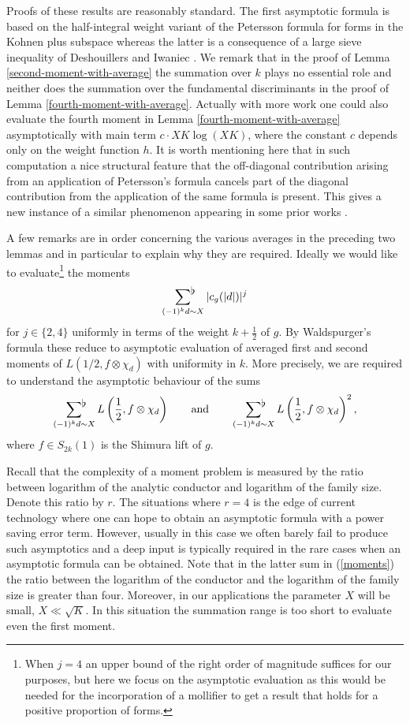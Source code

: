 \documentclass[a4paper,10pt,twoside]{amsart}
\theoremstyle{definition}
\numberwithin{equation}{section}
\renewcommand\:{\colon}
\newcommand{\sumflat}{\mathop{{\sum}^{\raisebox{-3pt}{\makebox[0pt][l]{$\flat$}}}}}
\begin{document}
Proofs of these results are reasonably standard. The first asymptotic formula is based on the half-integral weight variant of the Petersson formula for forms in the Kohnen plus subspace whereas the latter is a consequence of a large sieve inequality of Deshouillers and Iwaniec \cite{DI1982}. We remark that in the proof of Lemma \ref{second-moment-with-average} the summation over $k$ plays no essential role and neither does the summation over the fundamental discriminants in the proof of Lemma \ref{fourth-moment-with-average}. Actually with more work one could also evaluate the fourth moment in Lemma \ref{fourth-moment-with-average} asymptotically with main term $c\cdot XK\log(XK)$, where the constant $c$ depends only on the weight function $h$. It is worth mentioning here that in such computation a nice structural feature that the off-diagonal contribution arising from an application of Petersson's formula cancels part of the diagonal contribution from the application of the same formula is present. This gives a new instance of a similar phenomenon appearing in some prior works \cite{Blomer2004, Blomer2008, Khan2010}.

A few remarks are in order concerning the various averages in the preceding two lemmas and in particular to explain why they are required. Ideally we would like to evaluate\footnote{When $j=4$ an upper bound of the right order of magnitude suffices for our purposes, but here we focus on the asymptotic evaluation as this would be needed for the incorporation of a mollifier to get a result that holds for a positive proportion of forms.} the moments 
\begin{align*}
\sumflat_{(-1)^k d\sim X}|c_g(|d|)|^j
\end{align*}
for $j\in\{2,4\}$ uniformly in terms of the weight $k+\frac12$ of $g$. By Waldspurger's formula these reduce to asymptotic evaluation of averaged first and second moments of $L(1/2,f\otimes \chi_{d})$ with uniformity in $k$. More precisely, we are required to understand the asymptotic behaviour of the sums
\begin{align}\label{moments}
\sumflat_{(-1)^k d\sim X}L\left(\frac12,f\otimes\chi_{d}\right) \qquad\text{and}\qquad \sumflat_{(-1)^k d\sim X}L\left(\frac12,f\otimes\chi_{d}\right)^2,
\end{align}
where $f\in S_{2k}(1)$ is the Shimura lift of $g$.

Recall that the complexity of a moment problem is measured by the ratio between logarithm of the analytic conductor and logarithm of the family size. Denote this ratio by $r$. The situations where $r=4$ is the edge of current technology where one can hope to obtain an asymptotic formula with a power saving error term. However, usually in this case we often barely fail to produce such asymptotics and a deep input is typically required in the rare cases when an asymptotic formula can be obtained.  Note that in the latter sum in (\ref{moments}) the ratio between the logarithm of the conductor and the logarithm of the family size is greater than four. Moreover, in our applications the parameter $X$ will be small, $X\ll\sqrt K$. In this situation the summation range is too short to evaluate even the first moment.
\end{document}

